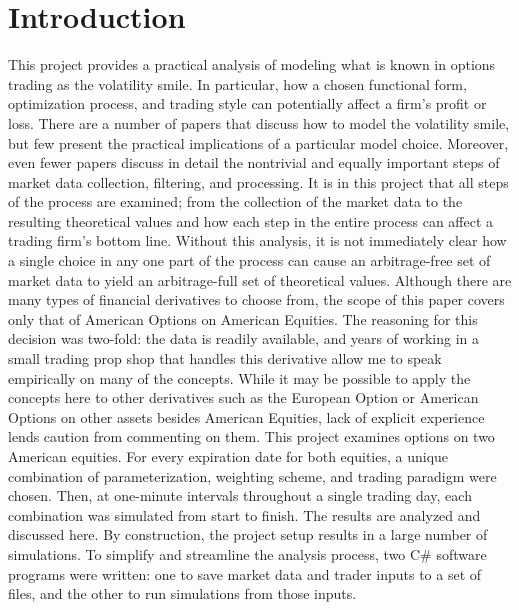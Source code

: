 \documentclass[12pt, a4paper, notitlepage]{article}
\numberwithin{equation}{subsection}
\numberwithin{figure}{subsection}
\numberwithin{table}{subsection}
\newcommand{\newpar}{\newline \newline}
\begin{document}
\section{Introduction} \label{sec:Introduction}
This project provides a practical analysis of modeling what is known in options trading as the volatility smile.  In particular, how a chosen functional form, optimization process, and trading style can potentially affect a firm's profit or loss.  There are a number of papers that discuss how to model the volatility smile, but few present the practical implications of a particular model choice.  Moreover, even fewer papers discuss in detail the nontrivial and equally important steps of market data collection, filtering, and processing.  It is in this project that all steps of the process are examined;  from the collection of the market data to the resulting theoretical values and how each step in the entire process can affect a trading firm's bottom line.
Without this analysis, it is not immediately clear how a single choice in any one part of the process can cause an arbitrage-free set of market data to yield an arbitrage-full set of theoretical values.
\newpar
Although there are many types of financial derivatives to choose from, the scope of this paper covers only that of American Options on American Equities.  The reasoning for this decision was two-fold: the data is readily available, and years of working in a small trading prop shop that handles this derivative allow me to speak empirically on many of the concepts.  While it may be possible to apply the concepts here to other derivatives such as the European Option or American Options on other assets besides American Equities, lack of explicit experience lends caution from commenting on them.
\newpar
This project examines options on two American equities.  For every expiration date for both equities, a unique combination of parameterization, weighting scheme, and trading paradigm were chosen.  Then, at one-minute intervals throughout a single trading day, each combination was simulated from start to finish.  The results are analyzed and discussed here.
\newpar
By construction, the project setup results in a large number of simulations.  To simplify and streamline the analysis process, two C\# software programs were written: one to save market data and trader inputs to a set of files, and the other to run simulations from those inputs.
\newpage
\end{document}
